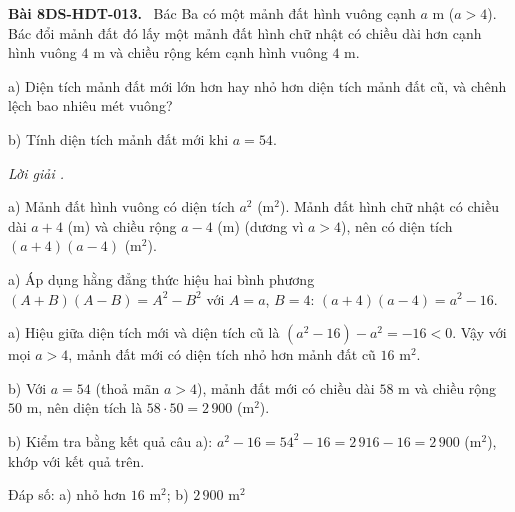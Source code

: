 \documentclass[12pt,a4paper]{article}
\newenvironment{problem}[1][]{\par\medskip\noindent\textbf{Bài #1.}\ }{\par}
\newenvironment{solution}[1][]{\par\noindent\textit{Lời giải #1.}\par}{\par}
\begin{document}
\begin{problem}[8DS-HDT-013]
Bác Ba có một mảnh đất hình vuông cạnh $a$ m ($a > 4$). Bác đổi mảnh đất đó lấy một mảnh đất hình chữ nhật có chiều dài hơn cạnh hình vuông $4$ m và chiều rộng kém cạnh hình vuông $4$ m.

a) Diện tích mảnh đất mới lớn hơn hay nhỏ hơn diện tích mảnh đất cũ, và chênh lệch bao nhiêu mét vuông?

b) Tính diện tích mảnh đất mới khi $a = 54$.

\begin{solution}
a) Mảnh đất hình vuông có diện tích $a^2$ (m$^2$). Mảnh đất hình chữ nhật có chiều dài $a + 4$ (m) và chiều rộng $a - 4$ (m) (dương vì $a > 4$), nên có diện tích $(a + 4)(a - 4)$ (m$^2$).

a) Áp dụng hằng đẳng thức hiệu hai bình phương $(A + B)(A - B) = A^2 - B^2$ với $A = a$, $B = 4$: $(a + 4)(a - 4) = a^2 - 16$.

a) Hiệu giữa diện tích mới và diện tích cũ là $(a^2 - 16) - a^2 = -16 < 0$. Vậy với mọi $a > 4$, mảnh đất mới có diện tích nhỏ hơn mảnh đất cũ $16$ m$^2$.

b) Với $a = 54$ (thoả mãn $a > 4$), mảnh đất mới có chiều dài $58$ m và chiều rộng $50$ m, nên diện tích là $58 \cdot 50 = 2\,900$ (m$^2$).

b) Kiểm tra bằng kết quả câu a): $a^2 - 16 = 54^2 - 16 = 2\,916 - 16 = 2\,900$ (m$^2$), khớp với kết quả trên.

Đáp số: a) $\boxed{\text{nhỏ hơn } 16 \text{ m}^2}$; b) $\boxed{2\,900 \text{ m}^2}$
\end{solution}
\end{problem}
\end{document}
